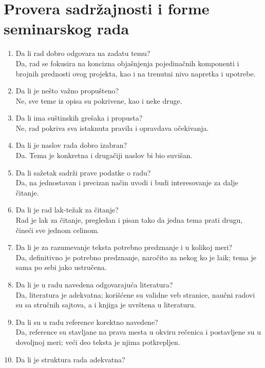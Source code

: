 \documentclass[a4paper]{report}
\begin{document}
	\section{Provera sadržajnosti i forme seminarskog rada}
	
	\begin{enumerate}
		\item Da li rad dobro odgovara na zadatu temu?\\
		Da, rad se fokusira na koncizna objašnjenja pojedinačnih komponenti i brojnih prednosti ovog projekta, kao i na trenutni nivo napretka i upotrebe.
		\item Da li je nešto važno propušteno?\\
		Ne, sve teme iz opisa su pokrivene, kao i neke druge.
		\item Da li ima suštinskih grešaka i propusta?\\
		Ne, rad pokriva sva istaknuta pravila i opravdava očekivanja.
		\item Da li je naslov rada dobro izabran?\\
		Da. Tema je konkretna i drugačiji naslov bi bio suvišan.
		\item Da li sažetak sadrži prave podatke o radu?\\
		Da, na jednostavan i precizan način uvodi i budi interesovanje za dalje čitanje.
		\item Da li je rad lak-težak za čitanje?\\
		Rad je lak za čitanje, pregledan i pisan tako da jedna tema prati drugu, čineći sve jednom celinom. 
		\item Da li je za razumevanje teksta potrebno predznanje i u kolikoj meri?\\
		Da, definitivno je potrebno predznanje, naročito za nekog ko je laik; tema je sama po sebi jako ustručena.
		\item Da li je u radu navedena odgovarajuća literatura?\\
		Da, literatura je adekvatna; korišćene su validne veb stranice, naučni radovi su sa stručnih sajtova, a i knjiga je uvrštena u literaturu.
		\item Da li su u radu reference korektno navedene?\\
		Da, reference su stavljane na prava mesta u okviru rečenica i postavljene su u dovoljnoj meri; veći deo teksta je njima potkrepljen. 
		\item Da li je struktura rada adekvatna?\\

\end{enumerate}
\end{document}
